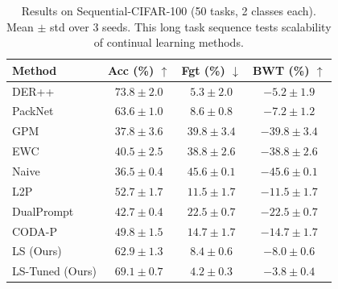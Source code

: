 \begin{table}[t]
\centering
\caption{Results on Sequential-CIFAR-100 (50 tasks, 2 classes each). Mean $\pm$ std over 3 seeds. This long task sequence tests scalability of continual learning methods.}
\label{tab:seq_cifar100}
\small
\begin{tabular}{lccc}
\toprule
Method & Acc (\%) $\uparrow$ & Fgt (\%) $\downarrow$ & BWT (\%) $\uparrow$ \\
\midrule
DER++ & $\mathbf{73.8} \pm 2.0$ & $5.3 \pm 2.0$ & $-5.2 \pm 1.9$ \\
PackNet & $63.6 \pm 1.0$ & $8.6 \pm 0.8$ & $-7.2 \pm 1.2$ \\
GPM & $37.8 \pm 3.6$ & $39.8 \pm 3.4$ & $-39.8 \pm 3.4$ \\
EWC & $40.5 \pm 2.5$ & $38.8 \pm 2.6$ & $-38.8 \pm 2.6$ \\
Naive & $36.5 \pm 0.4$ & $45.6 \pm 0.1$ & $-45.6 \pm 0.1$ \\
\midrule
L2P & $52.7 \pm 1.7$ & $11.5 \pm 1.7$ & $-11.5 \pm 1.7$ \\
DualPrompt & $42.7 \pm 0.4$ & $22.5 \pm 0.7$ & $-22.5 \pm 0.7$ \\
CODA-P & $49.8 \pm 1.5$ & $14.7 \pm 1.7$ & $-14.7 \pm 1.7$ \\
\midrule
LS (Ours) & $62.9 \pm 1.3$ & $8.4 \pm 0.6$ & $-8.0 \pm 0.6$ \\
LS-Tuned (Ours) & $69.1 \pm 0.7$ & $\mathbf{4.2} \pm 0.3$ & $\mathbf{-3.8} \pm 0.4$ \\
\bottomrule
\end{tabular}
\end{table}